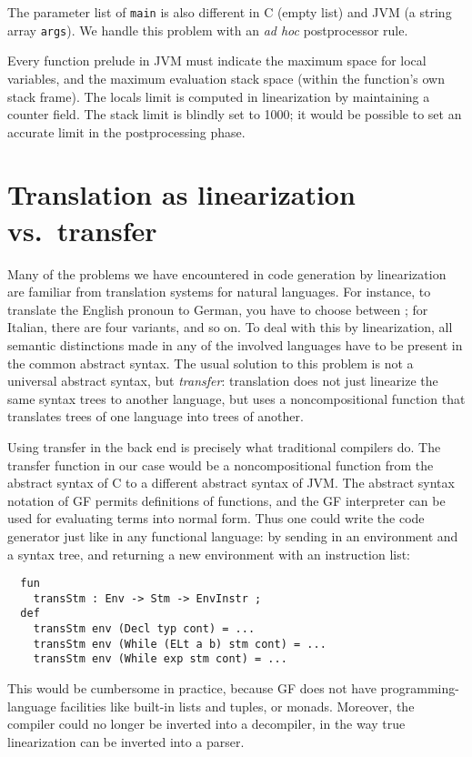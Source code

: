 \documentclass[12pt]{article}
\newcommand{\empha}[1]{{\em #1}}
\begin{document}
The parameter list of \texttt{main} is also different in C (empty list)
and JVM (a string array \texttt{args}). We handle this problem
with an \empha{ad hoc} postprocessor rule.

Every function prelude in JVM must indicate the maximum space for
local variables, and the maximum evaluation stack space (within
the function's own stack frame). The locals limit is computed in
linearization by maintaining a counter field. The stack limit
is blindly set to 1000; it would be possible to set an
accurate limit in the postprocessing phase.


\section{Translation as linearization vs.\ transfer}

Many of the problems we have encountered in code generation by
linearization are familiar from
translation systems for natural languages. For instance, to translate
the English pronoun  to German, you have to choose
between ; for Italian, there are four
variants, and so on. To deal with this by linearization,
all semantic distinctions made in any of the involved languages 
have to be present in the common abstract syntax. The usual solution to 
this problem is not a universal abstract syntax, but
\empha{transfer}: translation does not just linearize
the same syntax trees to another language, but uses
a noncompositional function that translates
trees of one language into trees of another.

Using transfer in the
back end is precisely what traditional compilers do.
The transfer function in our case would be a noncompositional
function from the abstract syntax of C to a different abstract
syntax of JVM. The abstract syntax notation of GF permits
definitions of functions, and the GF interpreter can be used
for evaluating terms into normal form. Thus one could write
the code generator just like in any functional language:
by sending in an environment and a syntax tree, and
returning a new environment with an instruction list:
\begin{verbatim}
  fun 
    transStm : Env -> Stm -> EnvInstr ;
  def
    transStm env (Decl typ cont) = ... 
    transStm env (While (ELt a b) stm cont) = ... 
    transStm env (While exp stm cont) = ... 
\end{verbatim}
This would be cumbersome in practice, because
GF does not have programming-language facilities 
like built-in lists and tuples, or monads. Moreover,
the compiler could no longer be inverted into a decompiler, 
in the way true linearization can be inverted into a parser.
\end{document}
